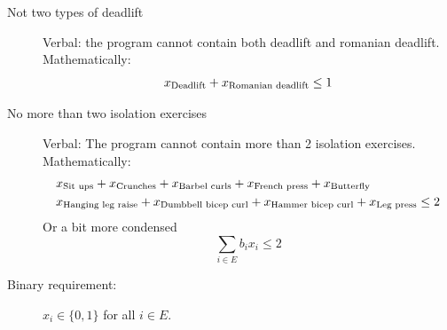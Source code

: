 \documentclass[11pt]{article}
\begin{document}
\begin{description}
{\begin{description}
            
            
            \item[Not two types of deadlift] Verbal: the program cannot contain both deadlift and romanian deadlift. Mathematically:
            \[
                x_{\textup{Deadlift}} + x_{\textup{Romanian deadlift}} \leq 1
            \]
            
            \item[No more than two isolation exercises] Verbal: The program cannot contain more than 2 isolation exercises. Mathematically:
            \begin{align}
                &x_{\textup{Sit ups}}+x_{\textup{Crunches}} + x_{\textup{Barbel curls}} + x_{\textup{French press}} + x_{\textup{Butterfly}}\\
                &x_{\textup{Hanging leg raise}} +x_{\textup{Dumbbell bicep curl}} + x_{\textup{Hammer bicep curl}} + x_{\textup{Leg press}}\leq 2
            \end{align}
            Or a bit more condensed
            \[
                \sum_{i\in E}b_ix_i\leq 2
            \]
            
            \item[Binary requirement:] $x_i\in \{0,1\}$ for all $i\in E$.
        \end{description}
        
}
\end{description}
\end{document}
